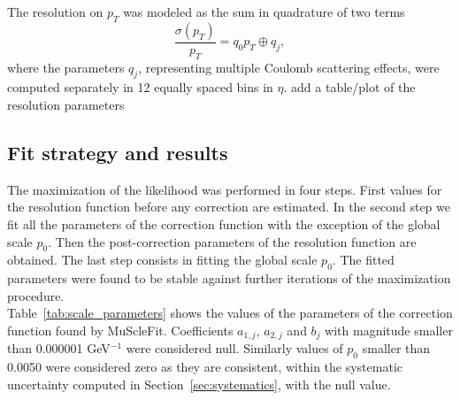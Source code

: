 The resolution on $p_T$ was modeled as the sum in quadrature of two terms
\begin{equation}
\frac{\sigma(p_T)}{p_T}=q_0 p_T \oplus q_j ,
\label{eq:resolution_function}
\end{equation}
where the parameters $q_j$, representing multiple Coulomb scattering
effects, were computed separately in 12 equally spaced bins in $\eta$. 
\FIXME add a table/plot of the resolution parameters 
\subsection{Fit strategy and results}
The maximization of the likelihood was performed in four steps. First
values for the resolution function before any correction are
estimated. In the second step we fit all the parameters of the correction function with
the exception of the global scale $p_0$. Then 
the post-correction parameters of the resolution function are obtained.
The last step consists in fitting the global scale $p_0$. 
The fitted parameters were found to be stable against further
iterations of the maximization procedure.\\
Table~\ref{tab:scale_parameters} shows the values of the 
parameters of the correction function found by MuScleFit. 
Coefficients $a_{1,j}$, $a_{2,j}$ and $b_j$ with magnitude smaller than
0.000001 GeV$^{-1}$ were considered null. Similarly values
of $p_0$ smaller than 0.0050 were considered zero as they 
are consistent, within the systematic uncertainty 
computed in Section~\ref{sec:systematics}, with the null value.
